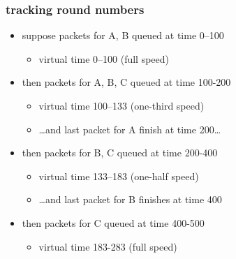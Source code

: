 \begin{frame}
\frametitle{tracking round numbers}
\begin{itemize}
\item suppose packets for A, B queued at time 0--100
    \begin{itemize}
    \item virtual time 0--100 (full speed)
    \end{itemize}
\item then packets for A, B, C queued at time 100-200
    \begin{itemize}
    \item virtual time 100--133 (one-third speed)
    \item \ldots and last packet for A finish at time 200\ldots
    \end{itemize}
\item then packets for B, C queued at time 200-400
    \begin{itemize}
    \item virtual time 133--183 (one-half speed)
    \item \ldots and last packet for B finishes at time 400
    \end{itemize}
\item then packets for C queued at time 400-500
    \begin{itemize}
    \item virtual time 183-283 (full speed)
    \end{itemize}
\end{itemize}
\end{frame}


